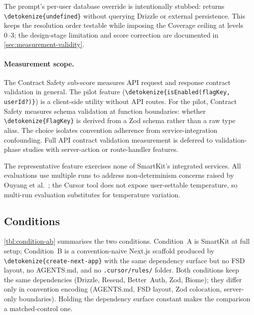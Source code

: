 \documentclass[12pt,a4paper]{report}
\newcommand{\code}[1]{\texttt{\nolinkurl{\detokenize{#1}}}}
\DeclareRobustCommand{\filename}[1]{\bgroup\urlstyle{tt}\nolinkurl{#1}\egroup}
\begin{document}
The prompt's per-user database override is intentionally stubbed:  returns \code{undefined} without querying Drizzle or external persistence. This keeps the resolution order testable while imposing the Coverage ceiling at levels 0--3; the design-stage limitation and score correction are documented in \autoref{sec:measurement-validity}.

\paragraph{Measurement scope.}
The Contract Safety sub-score measures API request and response contract validation in general. The pilot feature (\code{isEnabled(flagKey, userId?)}) is a client-side utility without API routes. For the pilot, Contract Safety measures schema validation at function boundaries: whether \code{FlagKey} is derived from a Zod schema rather than a raw type alias. The choice isolates convention adherence from service-integration confounding. Full API contract validation measurement is deferred to validation-phase studies with server-action or route-handler features.

The representative feature exercises none of SmartKit's integrated services. All evaluations use multiple runs to address non-determinism concerns raised by Ouyang et al.\ \parencite{ouyang2025nondeterminism}; the Cursor tool does not expose user-settable temperature, so multi-run evaluation substitutes for temperature variation.

\subsection{Conditions}
\label{sec:pilot-conditions}

\autoref{tbl:condition-ab} summarises the two conditions. Condition~A is SmartKit at full setup; Condition~B is a convention-naive Next.js scaffold produced by \code{create-next-app} with the same dependency surface but no FSD layout, no AGENTS.md, and no \filename{.cursor/rules/} folder. Both conditions keep the same dependencies (Drizzle, Resend, Better~Auth, Zod, Biome); they differ only in convention encoding (AGENTS.md, FSD layout, Zod colocation, server-only boundaries). Holding the dependency surface constant makes the comparison a matched-control one. 
\end{document}
